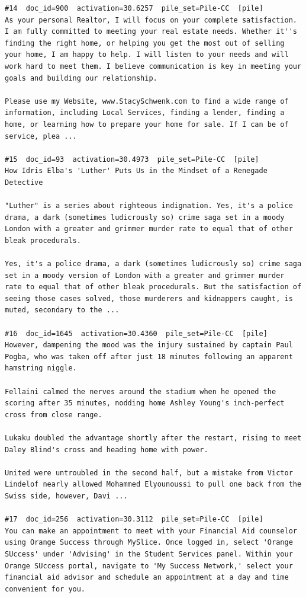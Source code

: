 \begin{verbatim}
#14  doc_id=900  activation=30.6257  pile_set=Pile-CC  [pile]
As your personal Realtor, I will focus on your complete satisfaction. I am fully committed to meeting your real estate needs. Whether it''s finding the right home, or helping you get the most out of selling your home, I am happy to help. I will listen to your needs and will work hard to meet them. I believe communication is key in meeting your goals and building our relationship.

Please use my Website, www.StacySchwenk.com to find a wide range of information, including Local Services, finding a lender, finding a home, or learning how to prepare your home for sale. If I can be of service, plea ...

#15  doc_id=93  activation=30.4973  pile_set=Pile-CC  [pile]
How Idris Elba's 'Luther' Puts Us in the Mindset of a Renegade Detective

"Luther" is a series about righteous indignation. Yes, it's a police drama, a dark (sometimes ludicrously so) crime saga set in a moody London with a greater and grimmer murder rate to equal that of other bleak procedurals.

Yes, it's a police drama, a dark (sometimes ludicrously so) crime saga set in a moody version of London with a greater and grimmer murder rate to equal that of other bleak procedurals. But the satisfaction of seeing those cases solved, those murderers and kidnappers caught, is muted, secondary to the ...

#16  doc_id=1645  activation=30.4360  pile_set=Pile-CC  [pile]
However, dampening the mood was the injury sustained by captain Paul Pogba, who was taken off after just 18 minutes following an apparent hamstring niggle.

Fellaini calmed the nerves around the stadium when he opened the scoring after 35 minutes, nodding home Ashley Young's inch-perfect cross from close range.

Lukaku doubled the advantage shortly after the restart, rising to meet Daley Blind's cross and heading home with power.

United were untroubled in the second half, but a mistake from Victor Lindelof nearly allowed Mohammed Elyounoussi to pull one back from the Swiss side, however, Davi ...

#17  doc_id=256  activation=30.3112  pile_set=Pile-CC  [pile]
You can make an appointment to meet with your Financial Aid counselor using Orange Success through MySlice. Once logged in, select 'Orange SUccess' under 'Advising' in the Student Services panel. Within your Orange SUccess portal, navigate to 'My Success Network,' select your financial aid advisor and schedule an appointment at a day and time convenient for you.


\end{verbatim}
